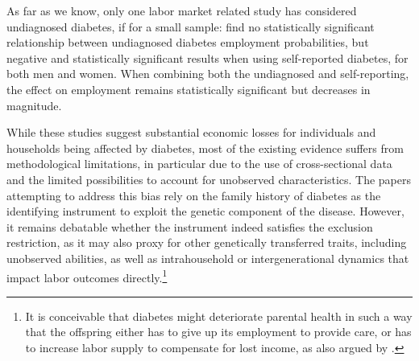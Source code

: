 \documentclass[12pt,english]{article}
\begin{document}
As far as we know, only one labor market related study has considered undiagnosed diabetes, if for a small sample: \textcite{Minor2015} find no statistically significant relationship between undiagnosed diabetes employment probabilities, but negative and statistically significant results when using self-reported diabetes, for both men and women. When combining both the undiagnosed and self-reporting, the effect on employment remains statistically significant but decreases in magnitude.

While these studies suggest substantial economic losses for individuals and households being affected by diabetes, most of the existing evidence suffers from methodological limitations, in particular due to the use of cross-sectional data and the limited possibilities to account for unobserved characteristics. The papers attempting to address this bias rely on the family history of diabetes as the identifying instrument to exploit the genetic component of the disease. However, it remains debatable whether the instrument indeed satisfies the exclusion restriction, as it may also proxy for other genetically transferred traits, including unobserved abilities, as well as  intrahousehold or intergenerational dynamics that impact labor outcomes directly.\footnote{It is conceivable that diabetes might deteriorate parental health in such a way that the offspring either has to give up its employment to provide care, or has to increase labor supply to compensate for lost income, as also argued by \textcite{Seuring2015}.} 
\end{document}
